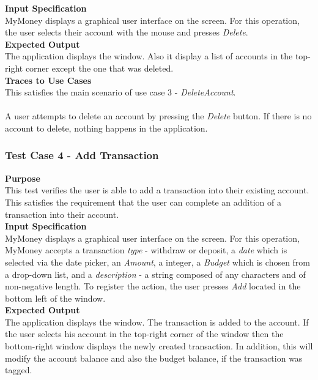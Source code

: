 \documentclass[12pt]{article}
\begin{document}
 \noindent
 {\bf Input Specification}\\
 MyMoney displays a graphical user interface on the screen.
 For this operation, the user selects their account with the mouse and presses \textit{Delete}.\\
                            
 \noindent
 {\bf Expected Output}\\
 The application displays the window.
 Also it display a list of accounts in the top-right corner except the one that was deleted.\\

\noindent
{\bf Traces to Use Cases}\\
This satisfies the main scenario of use case 3 - \textit{DeleteAccount}.\\

\\
A user attempts to delete an account by pressing the \textit{Delete} button. If there is no account to delete, nothing happens in the application.\\

\clearpage 

\subsubsection{Test Case 4 - Add Transaction} \label{TC-4}

\noindent
{\bf Purpose}\\
This test verifies the user is able to add a transaction into their existing account.
This satisfies the requirement that the user can complete an addition of a transaction into their account.\\
                                        
\noindent
{\bf Input Specification}\\
MyMoney displays a graphical user interface on the screen.
For this operation, MyMoney accepts a transaction \textit{type} - withdraw or deposit, a \textit{date}
which is selected via the date picker, an \textit{Amount}, a integer, a \textit{Budget} which is chosen
from a drop-down list, and a \textit{description} - a string composed of any characters and
of non-negative length. To register the action, the user presses \textit{Add} located in the bottom left
of the window. \\

\noindent
{\bf Expected Output}\\
The application displays the window.    
The transaction is added to the account.
If the user selects his account in the top-right corner of the window then
the bottom-right window displays the newly created transaction. In addition, this will modify the account balance and also the budget balance, if the transaction was tagged. \\
                                                
\end{document}

